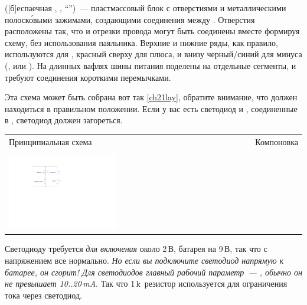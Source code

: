  ([б]еспаечная  , , ``'')\ ---
пластмассовый блок с отверстиями и металлическими полоск\'{о}выми зажимами,
создающими соединения между . Отверстия
расположены так, что  и отрезки провода могут
быть соединены вместе формируя схему, без использования паяльника. Верхние и
нижние ряды, как правило, используются для ,
красный сверху для плюса, и внизу черный/синий для минуса (, или ). На длинных вафлях шины
питания поделены на отдельные сегменты, и требуют соединения короткими
перемычками.


Эта схема может быть собрана вот так \ref{ch21lay}, обратите внимание, что
 должен находиться в правильном положении. Если у
вас есть светодиод и , соединенные в
, светодиод должен загореться.

\bigskip
\noindent\begin{tabular}{p{} p{}}
Принципиальная схема \label{ch21sch}
&
Компоновка \label{ch21lay} \\
&\\
\includegraphics[width=0.45\textwidth]{bcollis/led1/led1.pdf}
&
\\
\end{tabular}

\bigskip
Светодиоду требуется \emph{для включения} около 2\,В, батарея на
9\,В, так что с напряжением все нормально. \emph{Но если вы подключите светодиод
напрямую к батарее, он сгорит! Для светодиодов главный рабочий параметр\ ---
, обычно он не превышает
10..20\,mA}. Так что
1\,k\ резистор используется для ограничения тока
через светодиод.

